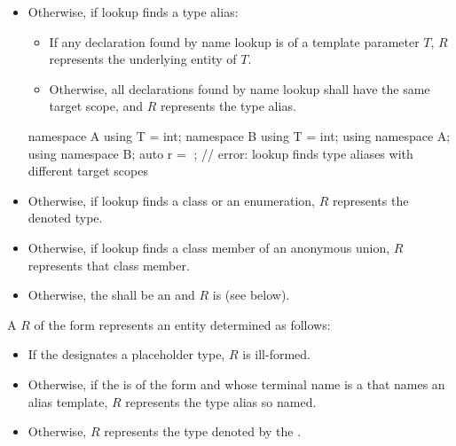 \begin{itemize}
\begin{itemize}
\item
Otherwise, if lookup finds an overload set,
that overload set shall contain only
declarations of a unique function template F;
$R$ represents F.
\item
Otherwise, if lookup finds
a class template, variable template, or alias template,
$R$ represents that template.
\begin{note}
Lookup never finds a partial or explicit specialization.
\end{note}
\end{itemize}
\item
Otherwise, if lookup finds a type alias:
\begin{itemize}
\item
If any declaration found by name lookup is of a template parameter $T$,
$R$ represents the underlying entity of $T$.
\item
Otherwise,
all declarations found by name lookup shall have the same target scope, and
$R$ represents the type alias.
\end{itemize}
\begin{example}
\begin{codeblock}
namespace A {
  using T = int;
}
namespace B {
  using T = int;
}
using namespace A;
using namespace B;
auto r = ^^T;           // error: lookup finds type aliases with different target scopes
\end{codeblock}
\end{example}
\item
Otherwise, if lookup finds a class or an enumeration,
$R$ represents the denoted type.
\item
Otherwise, if lookup finds a class member of an anonymous union, $R$ represents that class member.
\item
Otherwise,
the  shall be an  
and $R$ is  (see below).
\end{itemize}

\pnum
A  $R$ of the form
represents an entity determined as follows:
\begin{itemize}
\item
If the  designates
a placeholder type,
$R$ is ill-formed.
\item
Otherwise, if the  is of the form
  
and whose terminal name is a 
that names an alias template,
$R$ represents the type alias so named.
\item
Otherwise, $R$ represents the type denoted by the .
\end{itemize}

